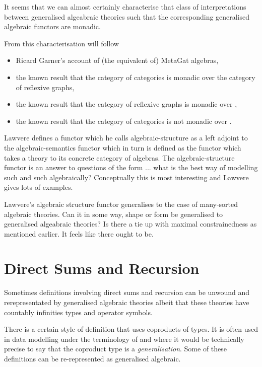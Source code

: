 \documentclass[10pt,a4paper]{article}
\theoremstyle{remark}
\begin{document}
\noindent
It seems that we can almost certainly characterise that class of interpretations between 
generalised algeabraic theories such that the corresponding generalised algebraic functors are monadic.

From this characterisation will follow 
\begin{itemize}
\item Ricard Garner's account of (the equivalent of) MetaGat algebras,
\item  the known result that the category of categories is monadic over the category of reflexive graphs, 
\item the known result that the category of reflexive graphs is monadic over ,
\item the known result that the category of categories is not monadic over .
\end{itemize}

\note
Lawvere defines a functor which he calls algebraic-structure as a  left adjoint  to the algebraic-semantics functor which in turn is defined as the functor which takes a theory to its concrete category of algebras. 
The algebraic-structure functor is an answer to questions of the form ... what is the best way of modelling such and such algebraically? 
Conceptually this is most interesting  and Lawvere gives lots of examples. 

Lawvere's algebraic structure functor generalises to the case of many-sorted algebraic theories.
Can it in some way, shape or form be generalised to generalised algeabraic theories? Is there a tie up with maximal constrainedness as mentioned earlier. It feels like there ought to be.

\section{Direct Sums and Recursion}

\note Sometimes definitions involving direct sums and recursion can be unwound and rerepresentated by
generalised algebraic theories albeit that these theories have countably infinities types and operator 
symbols.
 
There is a certain style of definition that uses coproducts of types. It is often used in data modelling 
under the terminology of  and where it would be technically precise to say that the
coproduct type is a \textit{generalisation}. Some of these definitions can be re-represented as generalised algebraic.
\end{document}
